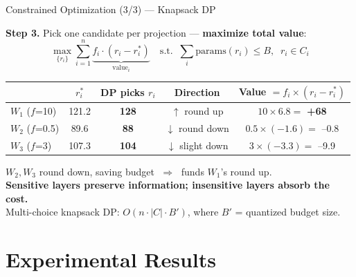 \documentclass[aspectratio=169,10pt]{beamer}
\begin{document}
\begin{frame}{Constrained Optimization (3/3) --- Knapsack DP}

\textbf{Step 3.} Pick one candidate per projection --- \textbf{maximize total value}:
\[
\max_{\{r_i\}} \sum_{i=1}^{n} \underbrace{f_i \cdot (r_i - r_i^*)}_{\text{value}_i} \quad\text{s.t.}\;\; \sum_{i} \text{params}(r_i) \leq B,\;\; r_i \in C_i
\]

\vspace{0.1cm}
\centering\small
\begin{tabular}{@{}lcccc@{}}
\toprule
 & $r_i^*$ & DP picks $r_i$ & Direction & Value $= f_i \times (r_i - r_i^*)$ \\
\midrule
$W_1$ ($f$=10) & 121.2 & \textbf{128} & $\uparrow$ round up & $10 \times 6.8 = $ \textcolor{cgreen}{\textbf{+68}} \\
$W_2$ ($f$=0.5) & 89.6 & \textbf{88} & $\downarrow$ round down & $0.5 \times (-1.6) = $ \textcolor{cred}{--0.8} \\
$W_3$ ($f$=3) & 107.3 & \textbf{104} & $\downarrow$ slight down & $3 \times (-3.3) = $ \textcolor{cred}{--9.9} \\
\bottomrule
\end{tabular}
\raggedright

\vspace{0.3cm}
$W_2, W_3$ round down, saving budget $\;\Rightarrow\;$ funds $W_1$'s round up.\\[0.1cm]
\textbf{Sensitive layers preserve information; insensitive layers absorb the cost.}\\[0.2cm]
{\footnotesize Multi-choice knapsack DP: $O(n \cdot |C| \cdot B')$, where $B'$ = quantized budget size.}
\end{frame}



\section{Experimental Results}
\end{document}
